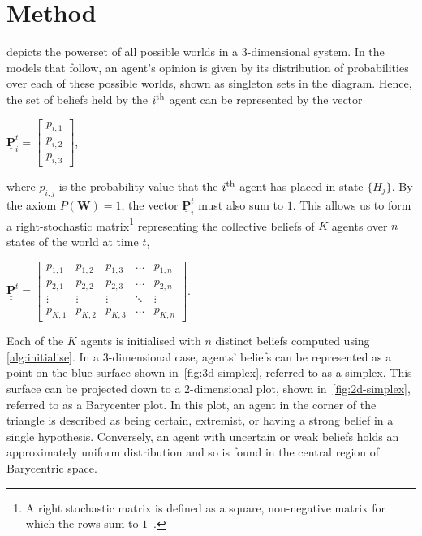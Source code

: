 \chapter{Method}\label{sect:method}



 depicts the powerset of all possible worlds in a $3$-dimensional system. In the models that follow, an agent's opinion is given by its distribution of probabilities over each of these possible worlds, shown as singleton sets in the diagram. Hence, the set of beliefs held by the $i^\textnormal{th}$ agent can be represented by the vector

\begin{center}
$ \underline{\mathbf{P}}^t_i = \begin{bmatrix}
    p_{i, 1}\\
    p_{i, 2}\\
    p_{i, 3}
\end{bmatrix}$,
\end{center}

where $p_{i,j}$ is the probability value that the $i^\textnormal{th}$ agent has placed in state $\{H_j\}$. By the axiom $P(\mathbf{W}) = 1$, the vector $\underline{\mathbf{P}}^t_i$ must also sum to $1$. This allows us to form a right-stochastic matrix\footnote{A right stochastic matrix is defined as a square, non-negative matrix for which the rows sum to $1$~\cite{Gagniuc2017MarkovExperimentation}.} representing the collective beliefs of $K$ agents over $n$ states of the world at time $t$,

\begin{center}
$\underline{\underline{\mathbf{P}}}^t = \begin{bmatrix}
    p_{1, 1} & p_{1, 2} & p_{1, 3} & \dots  & p_{1, n} \\
    p_{2, 1} & p_{2, 2} & p_{2, 3} & \dots  & p_{2, n} \\
    \vdots & \vdots & \vdots & \ddots & \vdots \\
    p_{K, 1} & p_{K, 2} & p_{K, 3} & \dots  & p_{K, n}
\end{bmatrix}$.
\end{center}

Each of the $K$ agents is initialised with $n$ distinct beliefs computed using \cref{alg:initialise}. In a $3$-dimensional case, agents' beliefs can be represented as a point on the blue surface shown in~\cref{fig:3d-simplex}, referred to as a simplex. This surface can be projected down to a $2$-dimensional plot, shown in~\cref{fig:2d-simplex}, referred to as a Barycenter plot. In this plot, an agent in the corner of the triangle is described as being certain, extremist, or having a strong belief in a single hypothesis. Conversely, an agent with uncertain or weak beliefs holds an approximately uniform distribution and so is found in the central region of Barycentric space.

